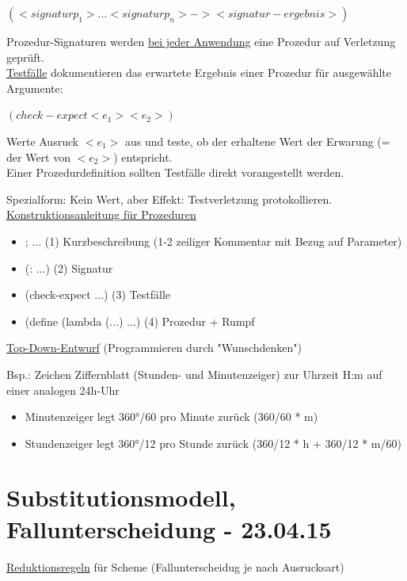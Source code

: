 \documentclass[a4paper, 20pt, openany]{book}
\begin{document}
\begin{center}
$(<signatur p_{1}> ... <signatur p_{n}> -> <signatur-ergebnis>)$
\end{center}

Prozedur-Signaturen werden \underline{bei jeder Anwendung} eine Prozedur auf Verletzung geprüft. \\


\underline{Testfälle} dokumentieren das erwartete Ergebnis einer Prozedur für ausgewählte Argumente:

\begin{center}
$(check-expect <e_{1}> <e_{2}>)$
\end{center}

Werte Ausruck $<e_{1}>$ aus und teste, ob der erhaltene Wert der Erwarung (= der Wert von $<e_{2}>$) entspricht. \\

Einer Prozedurdefinition sollten Testfälle direkt vorangestellt werden.

Spezialform: Kein Wert, aber Effekt: Testverletzung protokollieren.\\

\underline{Konstruktionsanleitung für Prozeduren}
\begin{itemize}
\item ; ... (1) Kurzbeschreibung (1-2 zeiliger Kommentar mit Bezug auf Parameter)
\item (: ...) (2) Signatur
\item (check-expect ...) (3) Testfälle
\item (define (lambda (...) ...) (4) Prozedur + Rumpf
\end{itemize}

\underline{Top-Down-Entwurf} (Programmieren durch "Wunschdenken") 

Bsp.: Zeichen Ziffernblatt (Stunden- und Minutenzeiger) zur Uhrzeit H:m auf einer analogen 24h-Uhr 
\begin{itemize}
\item Minutenzeiger legt 360°/60 pro Minute zurück (360/60 * m)
\item Stundenzeiger legt 360°/12 pro Stunde zurück (360/12 * h + 360/12 * m/60)
\end{itemize}

\chapter{Substitutionsmodell, Fallunterscheidung - 23.04.15}
\underline{Reduktionsregeln} für Scheme (Fallunterscheidug je nach Ausrucksart)
\end{document}
